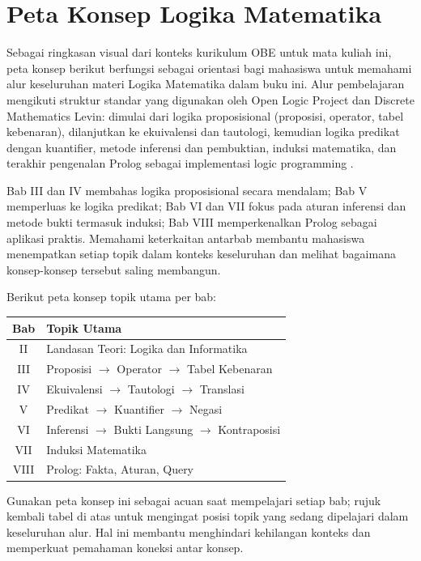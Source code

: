 \section{Peta Konsep Logika Matematika}

Sebagai ringkasan visual dari konteks kurikulum OBE untuk mata kuliah ini, peta konsep berikut berfungsi sebagai orientasi bagi mahasiswa untuk memahami alur keseluruhan materi Logika Matematika dalam buku ini. Alur pembelajaran mengikuti struktur standar yang digunakan oleh Open Logic Project dan Discrete Mathematics Levin: dimulai dari logika proposisional (proposisi, operator, tabel kebenaran), dilanjutkan ke ekuivalensi dan tautologi, kemudian logika predikat dengan kuantifier, metode inferensi dan pembuktian, induksi matematika, dan terakhir pengenalan Prolog sebagai implementasi logic programming \cite{openlogic,levin_discrete}.

Bab III dan IV membahas logika proposisional secara mendalam; Bab V memperluas ke logika predikat; Bab VI dan VII fokus pada aturan inferensi dan metode bukti termasuk induksi; Bab VIII memperkenalkan Prolog sebagai aplikasi praktis. Memahami keterkaitan antarbab membantu mahasiswa menempatkan setiap topik dalam konteks keseluruhan dan melihat bagaimana konsep-konsep tersebut saling membangun.

Berikut peta konsep topik utama per bab:

\begin{center}
\begin{tabular}{|c|l|}
\hline
\textbf{Bab} & \textbf{Topik Utama} \\
\hline
II & Landasan Teori: Logika dan Informatika \\
III & Proposisi $\rightarrow$ Operator $\rightarrow$ Tabel Kebenaran \\
IV & Ekuivalensi $\rightarrow$ Tautologi $\rightarrow$ Translasi \\
V & Predikat $\rightarrow$ Kuantifier $\rightarrow$ Negasi \\
VI & Inferensi $\rightarrow$ Bukti Langsung $\rightarrow$ Kontraposisi \\
VII & Induksi Matematika \\
VIII & Prolog: Fakta, Aturan, Query \\
\hline
\end{tabular}
\end{center}

Gunakan peta konsep ini sebagai acuan saat mempelajari setiap bab; rujuk kembali tabel di atas untuk mengingat posisi topik yang sedang dipelajari dalam keseluruhan alur. Hal ini membantu menghindari kehilangan konteks dan memperkuat pemahaman koneksi antar konsep.
